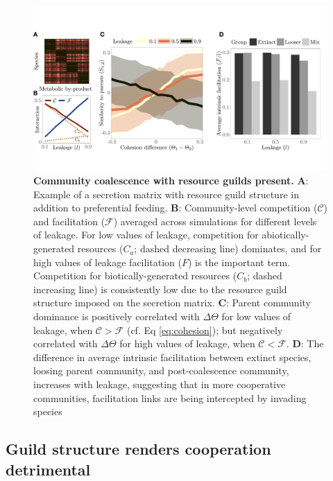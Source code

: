 \documentclass[10pt,letterpaper]{article}
\begin{document}
\begin{figure}[t]
\begin{adjustwidth}{-1.5in}{0in}
    \centering \includegraphics[width=1.3\columnwidth]{images/figure_4_compiled.pdf}
    \caption{\textbf{Community coalescence with resource guilds present.} {\bf A}: Example of a secretion matrix with resource guild structure in addition to preferential feeding. {\bf B}: Community-level competition ($\mathcal{C}$) and facilitation ($\mathcal{F}$) averaged across simulations for different levels of leakage. For low values of leakage, competition for abiotically-generated resources ($C_a$; dashed decreasing line) dominates, and for high values of leakage facilitation ($F$) is the important term. Competition for biotically-generated resources ($C_b$; dashed increasing line) is consistently low due to the resource guild structure imposed on the secretion matrix. {\bf C}: Parent community dominance is positively correlated with $\Delta \Theta$ for low values of leakage, when $\mathcal{C} > \mathcal{F}$ (cf. Eq \ref{eq:cohesion}); but negatively correlated with $\Delta \Theta$ for high values of leakage, when $\mathcal{C} < \mathcal{F}$. {\bf D}: The difference in average intrinsic facilitation between extinct species, loosing parent community, and post-coalescence community, increases with leakage, suggesting that in more cooperative communities, facilitation links are being intercepted by invading species}
    \label{fig:assumption2}
\end{adjustwidth}
\end{figure}

\subsection*{Guild structure renders cooperation detrimental}
\end{document}
